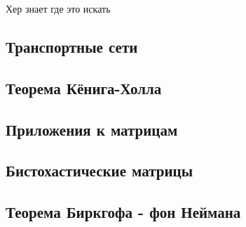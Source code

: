 \documentclass[a4paper, 12pt]{extarticle}
\begin{document}

























Хер знает где это искать















\subsection{Транспортные сети}
\subsection{Теорема Кёнига-Холла}
\subsection{Приложения к матрицам}
\subsection{Бистохастические матрицы}
\subsection{Теорема Биркгофа - фон Неймана}
\end{document}
